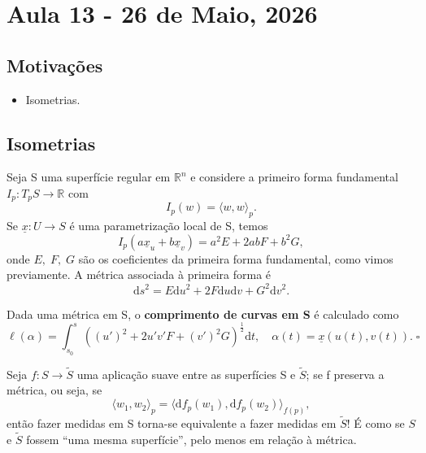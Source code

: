\documentclass[../differential_geometry.tex]{subfiles}
\begin{document}
\section{Aula 13 - 26 de Maio, 2026}
\subsection{Motivações}
\begin{itemize}
	\item Isometrias.
\end{itemize}
\subsection{Isometrias}
Seja S uma superfície regular em \(\mathbb{R}^{n}\) e considere a primeiro forma fundamental \(I_p:T_{p}S\rightarrow \mathbb{R}\) com
\[
	I_{p}(w) = \langle w, w \rangle_{p}.
\]
Se \(\underline{x}:U\rightarrow S\) é uma parametrização local de S, temos
\[
	I_{p}(a\underline{x}_u + b \underline{x}_v) = a^{2}E + 2ab F + b^{2}G,
\]
onde \(E,\; F, \; G\) são os coeficientes da primeira forma fundamental, como vimos previamente. A métrica associada à primeira forma é
\[
	\mathrm{d}s^{2} = E \mathrm{d}u^{2} + 2F \mathrm{d}u\mathrm{d}v + G^{2}\mathrm{d}v^{2}.
\]
\begin{def*}
	Dada uma métrica em S, o \textbf{comprimento de curvas em S} é calculado como
	\[
		\ell (\alpha ) = \int_{s_{0}}^{s}((u')^{2} + 2u'v'F + (v')^{2}G)^{\frac{1}{2}} \mathrm{d}t, \quad \alpha (t) = \underline{x}(u(t), v(t)). \; \square
	\]
\end{def*}
Seja \(f:S\rightarrow \tilde{S}\) uma aplicação suave entre as superfícies S e \(\tilde{S}\); se f preserva a métrica, ou seja, se
\[
	\langle w_1, w_2 \rangle_{p} = \langle \mathrm{d}f_{p}(w_1), \mathrm{d}f_{p}(w_2) \rangle_{f(p)},
\]
então fazer medidas em S torna-se equivalente a fazer medidas em \(\tilde{S}\)! É como se \(S\) e \(\tilde{S}\) fossem ``uma mesma superfície'', pelo menos em relação à métrica.
\end{document}

